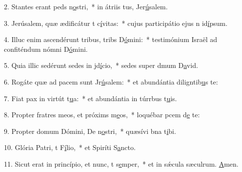 2. Stantes erant peds n\uline{o}stri,~* in átriis tus, Jer\uline{ú}salem.\par 
3. Jerúsalem, quæ ædificátur t c\uline{í}vitas:~* cujus participátio ejus n id\uline{í}psum.\par 
4. Illuc enim ascendérunt tribus, tribs D\uline{ó}mini:~* testimónium Israël ad confiténdum nómni D\uline{ó}mini.\par 
5. Quia illic sedérunt sedes in jd\uline{í}cio,~* sedes super dmum D\uline{a}vid.\par 
6. Rogáte quæ ad pacem sunt Jr\uline{ú}salem:~* et abundántia diligntib\uline{u}s te:\par 
7. Fiat pax in virtút t\uline{u}a:~* et abundántia in túrrbus t\uline{u}is.\par 
8. Propter fratres meos, et próxims m\uline{e}os,~* loquébar pcem d\uline{e} te:\par 
9. Propter domum Dómini, De n\uline{o}stri,~* quæsívi bna t\uline{i}bi.\par 
10. Glória Patri, t F\uline{í}lio,~* et Spiríti S\uline{a}ncto.\par 
11. Sicut erat in princípio, et nunc, t s\uline{e}mper,~* et in sǽcula sæculrum. \uline{A}men.\par 
